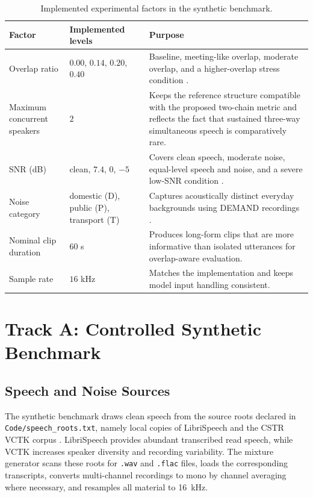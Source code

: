 \begin{table}[ht]
\centering
\caption{Implemented experimental factors in the synthetic benchmark.}
\label{tab:implemented_factors}
\begin{tabularx}{\textwidth}{l l X}
\toprule
\textbf{Factor} & \textbf{Implemented levels} & \textbf{Purpose} \\
\midrule
Overlap ratio & $0.00$, $0.14$, $0.20$, $0.40$ & Baseline, meeting-like overlap, moderate overlap, and a higher-overlap stress condition \citep{Shriberg2001ObservationsOO, chen2020continuousspeechseparationdataset, cosentino2020librimixopensourcedatasetgeneralizable}. \\
Maximum concurrent speakers & $2$ & Keeps the reference structure compatible with the proposed two-chain metric and reflects the fact that sustained three-way simultaneous speech is comparatively rare. \\
SNR (dB) & clean, $7.4$, $0$, $-5$ & Covers clean speech, moderate noise, equal-level speech and noise, and a severe low-SNR condition \citep{wu2018characteristics}. \\
Noise category & domestic (D), public (P), transport (T) & Captures acoustically distinct everyday backgrounds using DEMAND recordings \citep{demand}. \\
Nominal clip duration & $60$ s & Produces long-form clips that are more informative than isolated utterances for overlap-aware evaluation. \\
Sample rate & $16$ kHz & Matches the implementation and keeps model input handling consistent. \\
\bottomrule
\end{tabularx}
\end{table}

\section{Track A: Controlled Synthetic Benchmark}
\label{sec:synthetic_benchmark}

\subsection{Speech and Noise Sources}
The synthetic benchmark draws clean speech from the source roots declared in \texttt{Code/speech\_roots.txt}, namely local copies of LibriSpeech and the CSTR VCTK corpus \citep{librispeech, voxceleb}. LibriSpeech provides abundant transcribed read speech, while VCTK increases speaker diversity and recording variability. The mixture generator scans these roots for \texttt{.wav} and \texttt{.flac} files, loads the corresponding transcripts, converts multi-channel recordings to mono by channel averaging where necessary, and resamples all material to \SI{16}{\kilo\hertz}.

